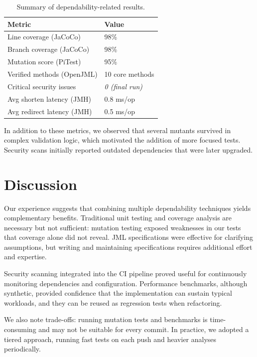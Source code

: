 \documentclass[sigconf]{acmart}
\begin{document}
\begin{table}[h]
  \centering
  \caption{Summary of dependability-related results.}
  \label{tab:results}
  \begin{tabular}{ll}
    \toprule
    Metric & Value \\
    \midrule
    Line coverage (JaCoCo) & 98\% \\
    Branch coverage (JaCoCo) & 98\% \\
    Mutation score (PiTest) & 95\% \\
    Verified methods (OpenJML) & 10 core methods \\
    Critical security issues & \textit{0 (final run)} \\
    Avg shorten latency (JMH) & 0.8 ms/op \\
    Avg redirect latency (JMH) & 0.5 ms/op \\
    \bottomrule
  \end{tabular}
\end{table}

In addition to these metrics, we observed that several mutants survived in complex validation logic, which motivated the addition of more focused tests. Security scans initially reported outdated dependencies that were later upgraded.

\section{Discussion}
Our experience suggests that combining multiple dependability techniques yields complementary benefits. Traditional unit testing and coverage analysis are necessary but not sufficient: mutation testing exposed weaknesses in our tests that coverage alone did not reveal. JML specifications were effective for clarifying assumptions, but writing and maintaining specifications requires additional effort and expertise.

Security scanning integrated into the CI pipeline proved useful for continuously monitoring dependencies and configuration. Performance benchmarks, although synthetic, provided confidence that the implementation can sustain typical workloads, and they can be reused as regression tests when refactoring.

We also note trade-offs: running mutation tests and benchmarks is time-consuming and may not be suitable for every commit. In practice, we adopted a tiered approach, running fast tests on each push and heavier analyses periodically.
\end{document}
